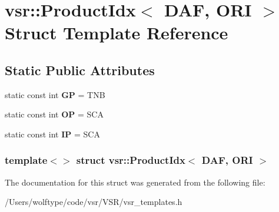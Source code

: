 \hypertarget{structvsr_1_1_product_idx_3_01_d_a_f_00_01_o_r_i_01_4}{\section{vsr\-:\-:Product\-Idx$<$ D\-A\-F, O\-R\-I $>$ Struct Template Reference}
\label{structvsr_1_1_product_idx_3_01_d_a_f_00_01_o_r_i_01_4}
}
\subsection*{Static Public Attributes}
\begin{DoxyCompactItemize}
\item 
\hypertarget{structvsr_1_1_product_idx_3_01_d_a_f_00_01_o_r_i_01_4_a259dd9352803ae7418bd6f8a5fb6308a}{static const int {\bfseries G\-P} = T\-N\-B}\label{structvsr_1_1_product_idx_3_01_d_a_f_00_01_o_r_i_01_4_a259dd9352803ae7418bd6f8a5fb6308a}

\item 
\hypertarget{structvsr_1_1_product_idx_3_01_d_a_f_00_01_o_r_i_01_4_a5bd6eb1cccc2bda34a6f917607d44d75}{static const int {\bfseries O\-P} = S\-C\-A}\label{structvsr_1_1_product_idx_3_01_d_a_f_00_01_o_r_i_01_4_a5bd6eb1cccc2bda34a6f917607d44d75}

\item 
\hypertarget{structvsr_1_1_product_idx_3_01_d_a_f_00_01_o_r_i_01_4_a6e9a67e83d5360cc842ec96f3e0763c1}{static const int {\bfseries I\-P} = S\-C\-A}\label{structvsr_1_1_product_idx_3_01_d_a_f_00_01_o_r_i_01_4_a6e9a67e83d5360cc842ec96f3e0763c1}

\end{DoxyCompactItemize}
\subsubsection*{template$<$$>$ struct vsr\-::\-Product\-Idx$<$ D\-A\-F, O\-R\-I $>$}



The documentation for this struct was generated from the following file\-:\begin{DoxyCompactItemize}
\item 
/\-Users/wolftype/code/vsr/\-V\-S\-R/vsr\-\_\-templates.\-h\end{DoxyCompactItemize}
